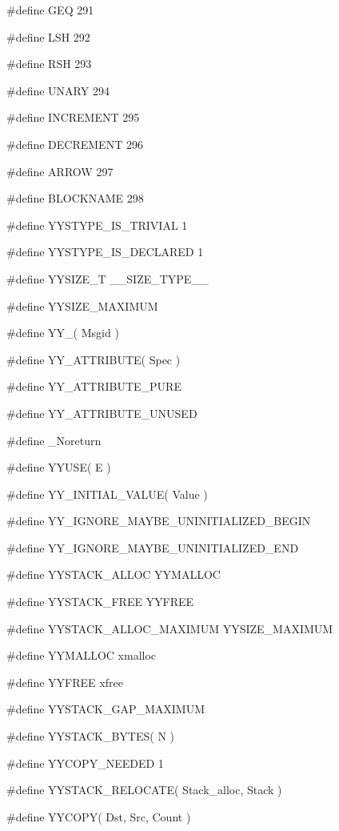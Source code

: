 \medskip
{\stt \#define GEQ 291}

\medskip
{\stt \#define LSH 292}

\medskip
{\stt \#define RSH 293}

\medskip
{\stt \#define UNARY 294}

\medskip
{\stt \#define INCREMENT 295}

\medskip
{\stt \#define DECREMENT 296}

\medskip
{\stt \#define ARROW 297}

\medskip
{\stt \#define BLOCKNAME 298}

\medskip
{\stt \#define YYSTYPE\_IS\_TRIVIAL 1}

\medskip
{\stt \#define YYSTYPE\_IS\_DECLARED 1}

\medskip
{\stt \#define YYSIZE\_T \_\_SIZE\_TYPE\_\_}

\medskip
{\stt \#define YYSIZE\_MAXIMUM}

\medskip
{\stt \#define YY\_( Msgid )}

\medskip
{\stt \#define YY\_ATTRIBUTE( Spec )}

\medskip
{\stt \#define YY\_ATTRIBUTE\_PURE}

\medskip
{\stt \#define YY\_ATTRIBUTE\_UNUSED}

\medskip
{\stt \#define \_Noreturn}

\medskip
{\stt \#define YYUSE( E )}

\medskip
{\stt \#define YY\_INITIAL\_VALUE( Value )}

\medskip
{\stt \#define YY\_IGNORE\_MAYBE\_UNINITIALIZED\_BEGIN}

\medskip
{\stt \#define YY\_IGNORE\_MAYBE\_UNINITIALIZED\_END}

\medskip
{\stt \#define YYSTACK\_ALLOC YYMALLOC}

\medskip
{\stt \#define YYSTACK\_FREE YYFREE}

\medskip
{\stt \#define YYSTACK\_ALLOC\_MAXIMUM YYSIZE\_MAXIMUM}

\medskip
{\stt \#define YYMALLOC xmalloc}

\medskip
{\stt \#define YYFREE xfree}

\medskip
{\stt \#define YYSTACK\_GAP\_MAXIMUM}

\medskip
{\stt \#define YYSTACK\_BYTES( N )}

\medskip
{\stt \#define YYCOPY\_NEEDED 1}

\medskip
{\stt \#define YYSTACK\_RELOCATE( Stack\_alloc, Stack )}

\medskip
{\stt \#define YYCOPY( Dst, Src, Count )}

